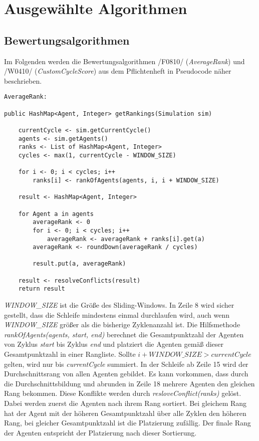 \section{Ausgewählte Algorithmen}

\subsection{Bewertungsalgorithmen}

Im Folgenden werden die Bewertungsalgorithmen /F0810/ (\emph{AverageRank}) und /W0410/ (\emph{CustomCycleScore}) aus dem Pflichtenheft in Pseudocode näher beschrieben. 

\begin{lstlisting}
AverageRank:

public HashMap<Agent, Integer> getRankings(Simulation sim) 
	
	currentCycle <- sim.getCurrentCycle()
	agents <- sim.getAgents()
	ranks <- List of HashMap<Agent, Integer>	
	cycles <- max(1, currentCycle - WINDOW_SIZE)
	
	for i <- 0; i < cycles; i++ 
		ranks[i] <- rankOfAgents(agents, i, i + WINDOW_SIZE)
	
	result <- HashMap<Agent, Integer>	
	
	for Agent a in agents
		averageRank <- 0
		for i <- 0; i < cycles; i++
			averageRank <- averageRank + ranks[i].get(a)
		averageRank <- roundDown(averageRank / cycles)
		
		result.put(a, averageRank)
	
	result <- resolveConflicts(result)
	return result
\end{lstlisting}
\emph{WINDOW\_SIZE} ist die Größe des Sliding-Windows. In Zeile 8 wird sicher gestellt, dass die Schleife mindestens einmal durchlaufen wird, auch wenn \emph{WINDOW\_SIZE} größer als die bisherige Zyklenanzahl ist.
Die Hilfsmethode \emph{rankOfAgents(agents, start, end)} berechnet die Gesamtpunktzahl der Agenten von Zyklus \emph{start} bis Zyklus \emph{end} und platziert die Agenten gemäß dieser Gesamtpunktzahl in einer Rangliste. Sollte $i + WINDOW\_SIZE > currentCycle$ gelten, wird nur bis \emph{currentCycle} summiert. 
In der Schleife ab Zeile 15 wird der Durchschnittsrang von allen Agenten gebildet.
Es kann vorkommen, dass durch die Durchschnittsbildung und abrunden in Zeile 18 mehrere Agenten den gleichen Rang bekommen. Diese Konflikte werden durch \emph{resloveConflict(ranks)} gelöst. Dabei werden zuerst die Agenten nach ihrem Rang sortiert. Bei gleichem Rang hat der Agent mit der höheren Gesamtpunktzahl über alle Zyklen den höheren Rang, bei gleicher Gesamtpunktzahl ist die Platzierung zufällig. Der finale Rang der Agenten entspricht der Platzierung nach dieser Sortierung.

